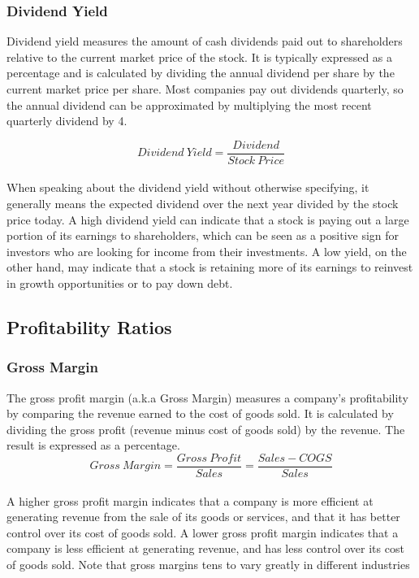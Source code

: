 \documentclass{article}
\begin{document}
\subsubsection{Dividend Yield}
Dividend yield measures the amount of cash dividends paid out to shareholders relative to the current market price of the stock. It is typically expressed as a percentage and is calculated by dividing the annual dividend per share by the current market price per share. Most companies pay out dividends quarterly, so the annual dividend can be approximated by multiplying the most recent quarterly dividend by 4. 

\begin{equation}
    Dividend\: Yield = \frac{Dividend}{Stock\: Price}
\end{equation}\\

When speaking about the dividend yield without otherwise specifying, it generally means the expected dividend over the next year divided by the stock price today. A high dividend yield can indicate that a stock is paying out a large portion of its earnings to shareholders, which can be seen as a positive sign for investors who are looking for income from their investments. A low yield, on the other hand, may indicate that a stock is retaining more of its earnings to reinvest in growth opportunities or to pay down debt.
\subsection{Profitability Ratios}
\subsubsection{Gross Margin}
The gross profit margin (a.k.a Gross Margin) measures a company's profitability by comparing the revenue earned to the cost of goods sold. It is calculated by dividing the gross profit (revenue minus cost of goods sold) by the revenue. The result is expressed as a percentage.
\begin{equation}
    Gross\: Margin = \frac{Gross\: Profit}{Sales} = \frac{Sales - COGS}{Sales}
\end{equation}\\

A higher gross profit margin indicates that a company is more efficient at generating revenue from the sale of its goods or services, and that it has better control over its cost of goods sold. A lower gross profit margin indicates that a company is less efficient at generating revenue, and has less control over its cost of goods sold. Note that gross margins tens to vary greatly in different industries
\end{document}
